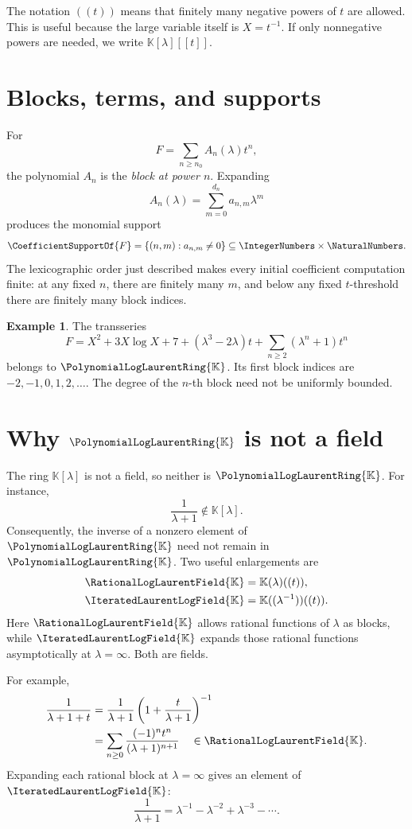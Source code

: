 \documentclass[11pt,openany]{book}
\theoremstyle{definition}
\newtheorem{example}{Example}[chapter]
\theoremstyle{plain}
\theoremstyle{remark}
\newcommand{\K}{\mathbb{K}}
\newcommand{\Plog}{\PolynomialLogLaurentRing{\K}}
\newcommand{\Rlog}{\RationalLogLaurentField{\K}}
\newcommand{\Hlog}{\IteratedLaurentLogField{\K}}
\begin{document}
The notation \(((t))\) means that finitely many negative powers of \(t\) are allowed. This is useful because the large variable itself is \(X=t^{-1}\). If only nonnegative powers are needed, we write \(\K[\lambda][[t]]\).

\section{Blocks, terms, and supports}
For
\[
 F=\sum_{n\ge n_0}A_n(\lambda)t^n,
\]
the polynomial \(A_n\) is the \emph{block at power \(n\)}. Expanding
\[
 A_n(\lambda)=\sum_{m=0}^{d_n}a_{n,m}\lambda^m
\]
produces the monomial support
\[
 \CoefficientSupportOf{F}=\{(n,m):a_{n,m}\ne0\}\subseteq\IntegerNumbers\times\NaturalNumbers.
\]
The lexicographic order just described makes every initial coefficient computation finite: at any fixed \(n\), there are finitely many \(m\), and below any fixed \(t\)-threshold there are finitely many block indices.

\begin{example}
The transseries
\[
 F=X^2+3X\log X+7+(\lambda^3-2\lambda)t
 +\sum_{n\ge2}(\lambda^n+1)t^n
\]
belongs to \(\Plog\). Its first block indices are \(-2,-1,0,1,2,\ldots\). The degree of the \(n\)-th block need not be uniformly bounded.
\end{example}

\section{Why \texorpdfstring{\(\Plog\)}{P} is not a field}
The ring \(\K[\lambda]\) is not a field, so neither is \(\Plog\). For instance,
\[
 \frac1{\lambda+1}\notin\K[\lambda].
\]
Consequently, the inverse of a nonzero element of \(\Plog\) need not remain in \(\Plog\). Two useful enlargements are
\begin{align}
 \Rlog&=\K(\lambda)((t)),\label{eq:Rlog}\\
 \Hlog&=\K((\lambda^{-1}))((t)).\label{eq:Hlog}
\end{align}
Here \(\Rlog\) allows rational functions of \(\lambda\) as blocks, while \(\Hlog\) expands those rational functions asymptotically at \(\lambda=\infty\). Both are fields.

For example,
\begin{align*}
 \frac1{\lambda+1+t}
 &=\frac1{\lambda+1}
 \left(1+\frac{t}{\lambda+1}\right)^{-1}\notag\\
 &=\sum_{n\ge0}\frac{(-1)^n t^n}{(\lambda+1)^{n+1}}
 \quad\in\Rlog.
\end{align*}
Expanding each rational block at \(\lambda=\infty\) gives an element of \(\Hlog\):
\[
 \frac1{\lambda+1}=\lambda^{-1}-\lambda^{-2}+\lambda^{-3}-\cdots.
\]
\end{document}
